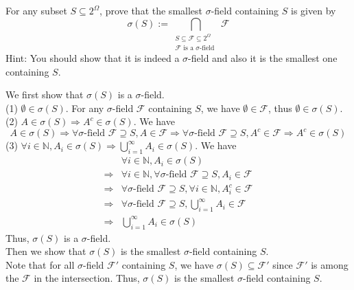 \documentclass[a4paper, justified]{tufte-handout}
\begin{document}

\begin{problem}
  For any subset $S \subseteq 2^\Omega$, prove that the smallest $\sigma$-field containing $S$ is given by 
  \[\sigma(S) := \bigcap_{\substack{S \subseteq \mathcal{F} \subseteq 2^\Omega\\ \mathcal{F} \text{ is a } \sigma\text{-field }} } \mathcal{F}\]
  Hint: You should show that it is indeed a $\sigma$-field and also it is the smallest one containing $S$. 
\end{problem}

\begin{solution}
  We first show that $\sigma(S)$ is a $\sigma$-field.\\
  (1) $\emptyset \in \sigma(S)$. For any $\sigma$-field $\mathcal{F}$ containing $S$, we have $\emptyset \in \mathcal{F}$, thus $\emptyset \in \sigma(S)$.\\
  (2) $A \in \sigma(S) \Rightarrow A^c \in \sigma(S)$. We have
  \[A \in \sigma(S) \Rightarrow \forall \sigma\text{-field } \mathcal{F} \supseteq S, A \in \mathcal{F} \Rightarrow \forall \sigma\text{-field } \mathcal{F} \supseteq S, A^c \in \mathcal{F} \Rightarrow A^c \in \sigma(S)\]
  (3) $\forall i \in \mathbb{N}, A_i \in \sigma(S) \Rightarrow \bigcup_{i=1}^\infty A_i \in \sigma(S)$. We have
  \[\begin{aligned}
    &\forall i \in \mathbb{N}, A_i \in \sigma(S) \\
    \Rightarrow& \forall i \in \mathbb{N}, \forall \sigma\text{-field } \mathcal{F} \supseteq S, A_i \in \mathcal{F} \\
    \Rightarrow& \forall \sigma\text{-field } \mathcal{F} \supseteq S, \forall i \in \mathbb{N}, A_i^c \in \mathcal{F} \\
    \Rightarrow& \forall \sigma\text{-field } \mathcal{F} \supseteq S, \bigcup_{i=1}^\infty A_i \in \mathcal{F}\\
    \Rightarrow& \bigcup_{i=1}^\infty A_i \in \sigma(S)
  \end{aligned}\]
  Thus, $\sigma(S)$ is a $\sigma$-field.\\
  Then we show that $\sigma(S)$ is the smallest $\sigma$-field containing $S$.\\
  Note that for all $\sigma$-field $\mathcal{F}'$ containing $S$, we have $\sigma(S) \subseteq \mathcal{F}'$ since $\mathcal{F}'$ is among the $\mathcal{F}$ in the intersection. Thus, $\sigma(S)$ is the smallest $\sigma$-field containing $S$.
\end{solution}
\end{document}
